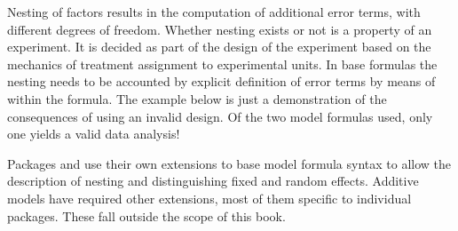 \documentclass[krantz2]{krantz}\usepackage{knitr}%
\begin{document}
Nesting of factors results in the computation of additional error terms, with different degrees of freedom. Whether nesting exists or not is a property of an experiment. It is decided as part of the design of the experiment based on the mechanics of treatment assignment to experimental units. In base \Rlang formulas the nesting needs to be accounted by explicit definition of error terms by means of  within the formula. The example below is just a demonstration of the consequences of using an invalid design. Of the two model formulas used, only one yields a valid data analysis!

\begin{knitrout}\footnotesize
{}\color{fgcolor}\begin{kframe}
\begin{alltt}
 \hlopt{~}  \hlopt{+}  \hlopt{+}  \hlopt{*} 
\end{alltt}
\end{kframe}
\end{knitrout}

Packages  and  use their own extensions to base \Rlang model formula syntax to allow the description of nesting and distinguishing fixed and random effects. Additive models have required other extensions, most of them specific to individual packages. These fall outside the scope of this book.
\end{document}

